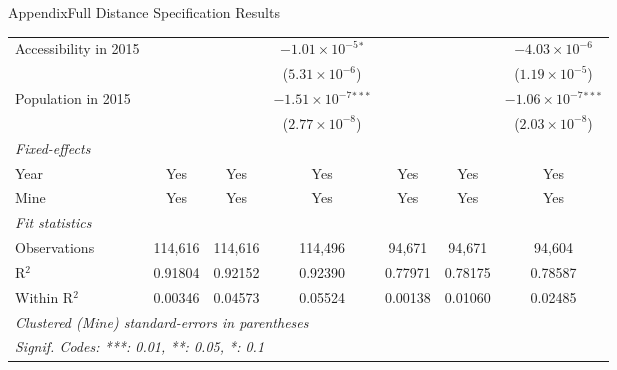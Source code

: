 \documentclass[aspectratio=169,11pt,dvipsnames, handout]{beamer}
\begin{document}
\begin{frame}{\textcolor{defaultclr!30}{Appendix}\hspace{0.75em}Full Distance Specification Results}
\begin{adjustbox}{width = 0.6\textwidth, center}
\begin{tabular}{lcccccc}
      Accessibility in 2015             &                         &                         & $-1.01\times 10^{-5}$$^{*}$    &                               &                               & $-4.03\times 10^{-6}$\\    
                                        &                         &                         & ($5.31\times 10^{-6}$)         &                               &                               & ($1.19\times 10^{-5}$)\\    
      Population in 2015                &                         &                         & $-1.51\times 10^{-7}$$^{***}$  &                               &                               & $-1.06\times 10^{-7}$$^{***}$\\    
                                        &                         &                         & ($2.77\times 10^{-8}$)         &                               &                               & ($2.03\times 10^{-8}$)\\    
      \midrule
      \emph{Fixed-effects}\\
      Year                              & Yes                     & Yes                     & Yes                            & Yes                           & Yes                           & Yes\\  
      Mine                              & Yes                     & Yes                     & Yes                            & Yes                           & Yes                           & Yes\\  
      \midrule
      \emph{Fit statistics}\\
      Observations                      & 114,616                 & 114,616                 & 114,496                        & 94,671                        & 94,671                        & 94,604\\  
      R$^2$                             & 0.91804                 & 0.92152                 & 0.92390                        & 0.77971                       & 0.78175                       & 0.78587\\  
      Within R$^2$                      & 0.00346                 & 0.04573                 & 0.05524                        & 0.00138                       & 0.01060                       & 0.02485\\  
      \midrule \midrule
      \multicolumn{7}{l}{\emph{Clustered (Mine) standard-errors in parentheses}}\\
      \multicolumn{7}{l}{\emph{Signif. Codes: ***: 0.01, **: 0.05, *: 0.1}}\\
   \end{tabular}
\end{adjustbox}


\hyperlink{frame:dist}{} 
    
\end{frame}
\end{document}

